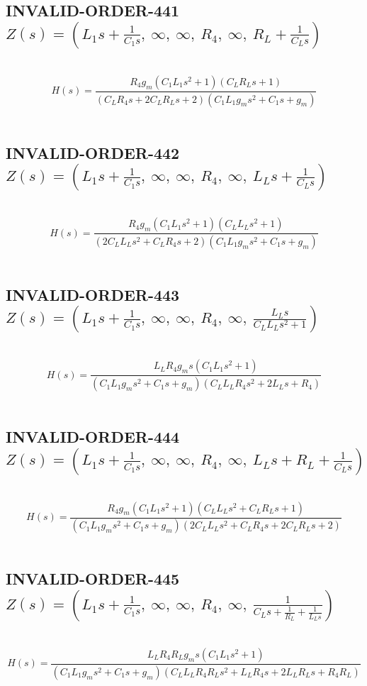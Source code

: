 \documentclass{article}
\begin{document}
\subsection{INVALID-ORDER-441 $Z(s) = \left( L_{1} s + \frac{1}{C_{1} s}, \  \infty, \  \infty, \  R_{4}, \  \infty, \  R_{L} + \frac{1}{C_{L} s}\right)$ } \ 
\textbf{\[H(s) = \frac{R_{4} g_{m} \left(C_{1} L_{1} s^{2} + 1\right) \left(C_{L} R_{L} s + 1\right)}{\left(C_{L} R_{4} s + 2 C_{L} R_{L} s + 2\right) \left(C_{1} L_{1} g_{m} s^{2} + C_{1} s + g_{m}\right)}\] } \ 
\subsection{INVALID-ORDER-442 $Z(s) = \left( L_{1} s + \frac{1}{C_{1} s}, \  \infty, \  \infty, \  R_{4}, \  \infty, \  L_{L} s + \frac{1}{C_{L} s}\right)$ } \ 
\textbf{\[H(s) = \frac{R_{4} g_{m} \left(C_{1} L_{1} s^{2} + 1\right) \left(C_{L} L_{L} s^{2} + 1\right)}{\left(2 C_{L} L_{L} s^{2} + C_{L} R_{4} s + 2\right) \left(C_{1} L_{1} g_{m} s^{2} + C_{1} s + g_{m}\right)}\] } \ 
\subsection{INVALID-ORDER-443 $Z(s) = \left( L_{1} s + \frac{1}{C_{1} s}, \  \infty, \  \infty, \  R_{4}, \  \infty, \  \frac{L_{L} s}{C_{L} L_{L} s^{2} + 1}\right)$ } \ 
\textbf{\[H(s) = \frac{L_{L} R_{4} g_{m} s \left(C_{1} L_{1} s^{2} + 1\right)}{\left(C_{1} L_{1} g_{m} s^{2} + C_{1} s + g_{m}\right) \left(C_{L} L_{L} R_{4} s^{2} + 2 L_{L} s + R_{4}\right)}\] } \ 
\subsection{INVALID-ORDER-444 $Z(s) = \left( L_{1} s + \frac{1}{C_{1} s}, \  \infty, \  \infty, \  R_{4}, \  \infty, \  L_{L} s + R_{L} + \frac{1}{C_{L} s}\right)$ } \ 
\textbf{\[H(s) = \frac{R_{4} g_{m} \left(C_{1} L_{1} s^{2} + 1\right) \left(C_{L} L_{L} s^{2} + C_{L} R_{L} s + 1\right)}{\left(C_{1} L_{1} g_{m} s^{2} + C_{1} s + g_{m}\right) \left(2 C_{L} L_{L} s^{2} + C_{L} R_{4} s + 2 C_{L} R_{L} s + 2\right)}\] } \ 
\subsection{INVALID-ORDER-445 $Z(s) = \left( L_{1} s + \frac{1}{C_{1} s}, \  \infty, \  \infty, \  R_{4}, \  \infty, \  \frac{1}{C_{L} s + \frac{1}{R_{L}} + \frac{1}{L_{L} s}}\right)$ } \ 
\textbf{\[H(s) = \frac{L_{L} R_{4} R_{L} g_{m} s \left(C_{1} L_{1} s^{2} + 1\right)}{\left(C_{1} L_{1} g_{m} s^{2} + C_{1} s + g_{m}\right) \left(C_{L} L_{L} R_{4} R_{L} s^{2} + L_{L} R_{4} s + 2 L_{L} R_{L} s + R_{4} R_{L}\right)}\] } \ 
\end{document}

